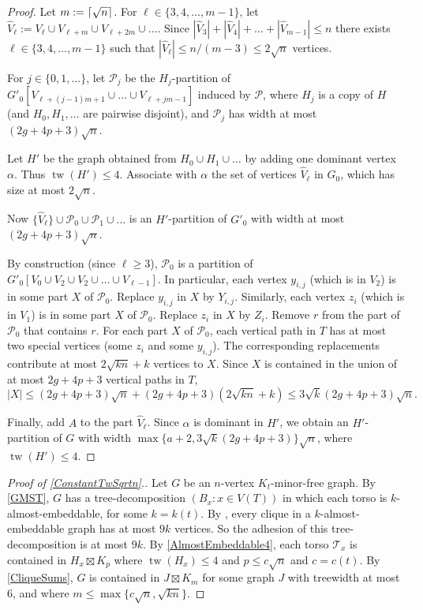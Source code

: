 \documentclass[12pt]{article}
\DeclarePairedDelimiter{\ceil}{\lceil}{\rceil}
\renewcommand{\geq}{\geqslant}
\renewcommand{\leq}{\leqslant}
\DeclareMathOperator{\tw}{tw}
\newcommand{\PP}{\mathcal{P}}
\theoremstyle{plain}
\theoremstyle{definition}
\begin{document}
\begin{proof}
	Let $m:= \ceil{\sqrt{n}}$. 
	For $\ell\in\{3,4,\dots,m-1\}$, 
	let $\widehat{V}_\ell:= V_\ell \cup V_{\ell+m}\cup V_{\ell+2m}\cup\dots$.
	Since $|\widehat{V}_3|+|\widehat{V}_4|+\dots+|\widehat{V}_{m-1}| \leq n$ there exists  $\ell\in\{3,4,\dots,m-1\}$ such that $|\widehat{V}_\ell|\leq n/(m-3) \leq 2\sqrt{n}$ vertices.  
	
	For $j\in\{0,1,\dots\}$, let $\PP_j$ be the $H_j$-partition of $G'_0[V_{\ell+(j-1)m+1}\cup \dots\cup V_{\ell+jm-1}]$ induced by $\PP$, where $H_j$ is a copy of $H$ (and $H_0,H_1,\dots$ are pairwise disjoint), and $\PP_j$ has width at most $(2g+4p+3)\sqrt{n}$.
	
	Let $H'$ be the graph obtained from $H_0\cup H_1\cup \dots$ by adding one dominant vertex $\alpha$. Thus $\tw(H')\leq 4$. Associate with $\alpha$ the set of vertices $\widehat{V}_\ell$ in $G_0$, which has size at most $2\sqrt{n}$. 
	
	Now $\{\widehat{V}_\ell\}\cup\PP_0\cup\PP_1\cup\dots$ is an $H'$-partition of $G'_0$  with width at most $(2g+4p+3)\sqrt{n}$.
	
By construction  (since $\ell\geq 3$), $\PP_0$ is a partition of $G'_0[V_0\cup V_2\cup V_2\cup\dots\cup V_{\ell-1}]$. In particular, each vertex $y_{i,j}$ (which is in $V_2$) is in some part $X$ of $\PP_0$. Replace $y_{i,j}$ in $X$ by $Y_{i,j}$. Similarly, each vertex $z_{i}$ (which is in $V_1$) is in some part $X$ of $\PP_0$. Replace $z_i$ in $X$ by $Z_i$. Remove $r$ from the part of $\PP_0$ that contains $r$. 
	For each part $X$ of $\PP_0$, each vertical path in $T$ has at most two special vertices (some $z_i$ and some $y_{i,j}$). The corresponding replacements contribute at most $2\sqrt{kn}+k$ vertices to $X$. Since $X$ is contained in the union of at most $2g+4p+3$ vertical paths in $T$, 
	$$|X|\leq (2g+4p+3)\sqrt{n} + (2g+4p+3)(2\sqrt{kn}+k) \leq 3\sqrt{k}(2g+4p+3)\sqrt{n}.$$
	
	Finally, add $A$ to the part $\widehat{V}_\ell$. Since $\alpha$ is dominant in $H'$, we obtain an $H'$-partition of $G$ with width 
	$\max\{a+2,3\sqrt{k}(2g+4p+3)\}\sqrt{n}$, where $\tw(H')\leq 4$. 
\end{proof}



\begin{proof}[Proof of \cref{ConstantTwSqrtn}.]
Let $G$ be an $n$-vertex $K_t$-minor-free graph. By \cref{GMST}, $G$ has a tree-decomposition $(B_x:x\in V(T))$ in which each torso is $k$-almost-embeddable, for some $k=k(t)$. By 
\citep[Lemma 21]{DMW17}, every clique in a $k$-almost-embeddable graph has at most $9k$ vertices. So the adhesion of this tree-decomposition is at most $9k$. 
By \cref{AlmostEmbeddable4}, each torso $\mathcal{T}_x$ is contained in $H_x\boxtimes K_p$ where $\tw(H_x)\leq 4$ and $p\leq c\sqrt{n}$ and $c=c(t)$. 
By \cref{CliqueSums}, $G$ is contained in $J\boxtimes K_m$ for some graph $J$ with treewidth at most $6$, and where $m\leq\max\{c\sqrt{n},\sqrt{kn}\}$.
\end{proof}
\end{document}
